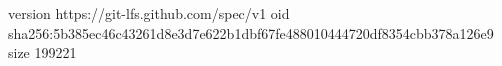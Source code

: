 version https://git-lfs.github.com/spec/v1
oid sha256:5b385ec46c43261d8e3d7e622b1dbf67fe488010444720df8354cbb378a126e9
size 199221

